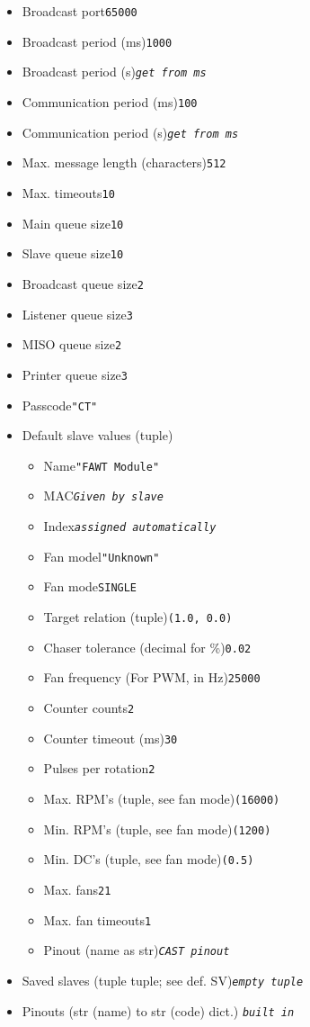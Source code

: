 \documentclass{article}
\newcommand{\dt}[1]{\dotfill \texttt{#1}}
\newcommand{\vp}{\vspace{1em}}
\newcommand{\et}{\textit{empty tuple}}
\begin{document}
\begin{multicols}{2}
\begin{itemize}
    \begin{itemize}
    \item Broadcast port\dt{65000}
    \item Broadcast period (ms)\dt{1000}
    \item Broadcast period (s)\dt{\textit{get from ms}}
    \item Communication period (ms)\dt{100}
    \item Communication period (s)\dt{\textit{get from ms}}
    \item Max. message length (characters)\dt{512}
    \item Max. timeouts\dt{10}
    \vp
    \item Main queue size\dt{10}
    \item Slave queue size\dt{10}
    \item Broadcast queue size\dt{2}
    \item Listener queue size\dt{3}
    \item MISO queue size\dt{2}
    \item Printer queue size\dt{3}
    \item Passcode\dt{"CT"}
    \vp
    \item Default slave values (tuple)\dt{}
        \begin{itemize}
            \item Name\dt{"FAWT Module"}
            \item MAC\dt{\textit{Given by slave}}
            \item Index\dt{\textit{assigned automatically}}
            \vp
            \item Fan model\dt{"Unknown"}
            \item Fan mode\dt{SINGLE}
            \item Target relation (tuple)\dt{(1.0, 0.0)}
            \item Chaser tolerance (decimal for \%)\dt{0.02}
            \item Fan frequency (For PWM, in Hz)\dt{25000}
            \item Counter counts\dt{2}
            \item Counter timeout (ms)\dt{30}
            \item Pulses per rotation\dt{2}
            \item Max. RPM's (tuple, see fan mode)\dt{(16000)}
            \item Min. RPM's (tuple, see fan mode)\dt{(1200)}
            \item Min. DC's (tuple, see fan mode)\dt{(0.5)}
            \item Max. fans\dt{21}
            \item Max. fan timeouts\dt{1}
            \item Pinout (name as str)\dt{\textit{CAST pinout}}
        \end{itemize}
    \item Saved slaves (tuple tuple; see def. SV)\dt{\et}
    \item Pinouts (str (name) to str (code) dict.)
        \dt{\textit{built in}}
    \end{itemize}


\end{itemize}
\end{multicols}
\end{document}
